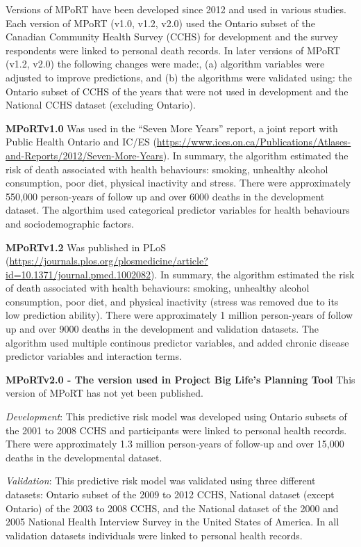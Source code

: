 \documentclass[]{book}
\begin{document}
Versions of MPoRT have been developed since 2012 and used in various
studies. Each version of MPoRT (v1.0, v1.2, v2.0) used the Ontario
subset of the Canadian Community Health Survey (CCHS) for development
and the survey respondents were linked to personal death records. In
later versions of MPoRT (v1.2, v2.0) the following changes were made:,
(a) algorithm variables were adjusted to improve predictions, and (b)
the algorithms were validated using: the Ontario subset of CCHS of the
years that were not used in development and the National CCHS dataset
(excluding Ontario).

\textbf{MPoRTv1.0} Was used in the ``Seven More Years'' report, a joint
report with Public Health Ontario and IC/ES
(\url{https://www.ices.on.ca/Publications/Atlases-and-Reports/2012/Seven-More-Years}).
In summary, the algorithm estimated the risk of death associated with
health behaviours: smoking, unhealthy alcohol consumption, poor diet,
physical inactivity and stress. There were approximately 550,000
person-years of follow up and over 6000 deaths in the development
dataset. The algorthim used categorical predictor variables for health
behaviours and sociodemographic factors.

\textbf{MPoRTv1.2} Was published in PLoS
(\url{https://journals.plos.org/plosmedicine/article?id=10.1371/journal.pmed.1002082}).
In summary, the algorithm estimated the risk of death associated with
health behaviours: smoking, unhealthy alcohol consumption, poor diet,
and physical inactivity (stress was removed due to its low prediction
ability). There were approximately 1 million person-years of follow up
and over 9000 deaths in the development and validation datasets. The
algorithm used multiple continous predictor variables, and added chronic
disease predictor variables and interaction terms.

\textbf{MPoRTv2.0 - The version used in Project Big Life's Planning
Tool} This version of MPoRT has not yet been published.

\emph{Development}: This predictive risk model was developed using
Ontario subsets of the 2001 to 2008 CCHS and participants were linked to
personal health records. There were approximately 1.3 million
person-years of follow-up and over 15,000 deaths in the developmental
dataset.

\emph{Validation}: This predictive risk model was validated using three
different datasets: Ontario subset of the 2009 to 2012 CCHS, National
dataset (except Ontario) of the 2003 to 2008 CCHS, and the National
dataset of the 2000 and 2005 National Health Interview Survey in the
United States of America. In all validation datasets individuals were
linked to personal health records.
\end{document}
